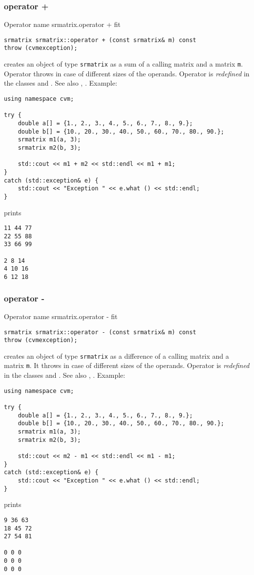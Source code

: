 \subsubsection{operator +}
Operator%
\pdfdest name {srmatrix.operator +} fit
\begin{verbatim}
srmatrix srmatrix::operator + (const srmatrix& m) const
throw (cvmexception);
\end{verbatim}
creates an object of type \verb"srmatrix" as a sum of
a calling matrix and a matrix \verb"m".
Operator throws  
in case of different sizes of the operands.
Operator is \emph{redefined} in the classes
and .
See also , .
Example:
\begin{Verbatim}
using namespace cvm;

try {
    double a[] = {1., 2., 3., 4., 5., 6., 7., 8., 9.};
    double b[] = {10., 20., 30., 40., 50., 60., 70., 80., 90.};
    srmatrix m1(a, 3);
    srmatrix m2(b, 3);

    std::cout << m1 + m2 << std::endl << m1 + m1;
}
catch (std::exception& e) {
    std::cout << "Exception " << e.what () << std::endl;
}
\end{Verbatim}
prints
\begin{Verbatim}
11 44 77
22 55 88
33 66 99

2 8 14
4 10 16
6 12 18
\end{Verbatim}
\newpage




\subsubsection{operator -}
Operator%
\pdfdest name {srmatrix.operator -} fit
\begin{verbatim}
srmatrix srmatrix::operator - (const srmatrix& m) const
throw (cvmexception);
\end{verbatim}
creates an object of type \verb"srmatrix" as a difference of
a calling matrix and a matrix \verb"m".
It throws  
in case of different sizes of the operands.
Operator is \emph{redefined} in the classes
and .
See also , .
Example:
\begin{Verbatim}
using namespace cvm;

try {
    double a[] = {1., 2., 3., 4., 5., 6., 7., 8., 9.};
    double b[] = {10., 20., 30., 40., 50., 60., 70., 80., 90.};
    srmatrix m1(a, 3);
    srmatrix m2(b, 3);

    std::cout << m2 - m1 << std::endl << m1 - m1;
}
catch (std::exception& e) {
    std::cout << "Exception " << e.what () << std::endl;
}
\end{Verbatim}
prints
\begin{Verbatim}
9 36 63
18 45 72
27 54 81

0 0 0
0 0 0
0 0 0
\end{Verbatim}
\newpage


